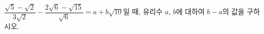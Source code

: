 $\dfrac{\sqrt{5}-\sqrt{2}}{3\sqrt{2}}-\dfrac{2\sqrt{6}-\sqrt{15}}{\sqrt{6}}=a+b\sqrt{10}$일 때, 유리수 $a$, $b$에 대하여 $b-a$의 값을 구하시오.
